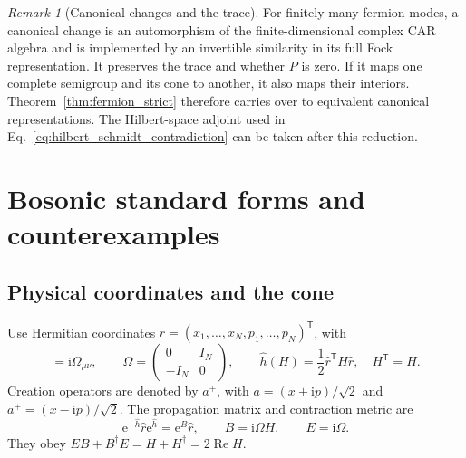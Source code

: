 \documentclass[11pt,a4paper]{article}
\newcommand{\ee}{\mathrm e}
\newcommand{\ii}{\mathrm i}
\newcommand{\trans}{\mathsf T}
\theoremstyle{remark}
\newtheorem{remark}{Remark}
\numberwithin{equation}{section}
\begin{document}
\begin{remark}[Canonical changes and the trace]
For finitely many fermion modes, a canonical change is an automorphism of
the finite-dimensional complex CAR algebra and is implemented by an
invertible similarity in its full Fock representation. It preserves the
trace and whether \(P\) is zero. If it maps one complete semigroup and its
cone to another, it also maps their interiors. Theorem~\ref{thm:fermion_strict}
therefore carries over to equivalent canonical representations. The
Hilbert-space adjoint used in Eq.~\eqref{eq:hilbert_schmidt_contradiction}
can be taken after this reduction.
\end{remark}

\section{Bosonic standard forms and counterexamples}
\label{sec:counterexamples}

\subsection{Physical coordinates and the cone}

Use Hermitian coordinates
\(\hat r=(x_1,\ldots,x_N,p_1,\ldots,p_N)^\trans\), with
\begin{equation}
[\hat r_\mu,\hat r_\nu]=\ii\Omega_{\mu\nu},\qquad
\Omega=\begin{pmatrix}0&I_N\\-I_N&0\end{pmatrix},\qquad
\hat h(H)=\frac12\hat r^\trans H\hat r,
\quad H^\trans=H.
\label{eq:boson_quadrature}
\end{equation}
Creation operators are denoted by \(a^+\), with
\(a=(x+\ii p)/\sqrt2\) and \(a^+=(x-\ii p)/\sqrt2\). The propagation
matrix and contraction metric are
\begin{equation}
\ee^{-\hat h}\hat r\ee^{\hat h}=\ee^{B}\hat r,
\qquad B=\ii\Omega H,\qquad E=\ii\Omega.
\label{eq:boson_propagation}
\end{equation}
They obey
\(EB+B^\dagger E=H+H^\dagger=2\operatorname{Re}H\).
\end{document}
